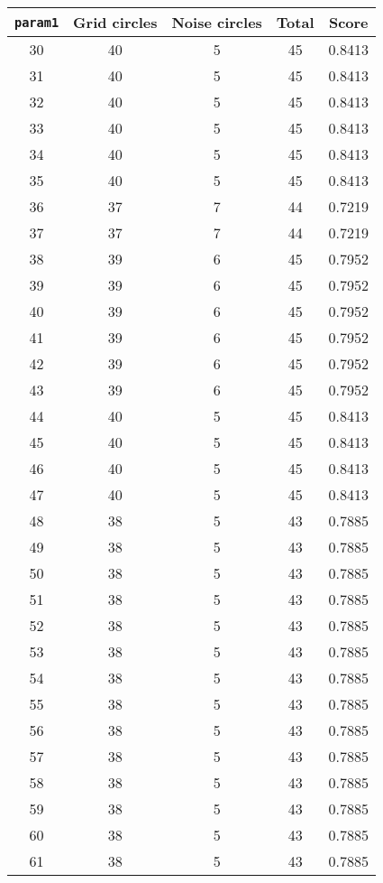 \documentclass[letterpaper, 12pt]{article}
\begin{document}
\begin{longtable}{|c|c|c|c|c|}
\hline
\textbf{\texttt{param1}} & \textbf{Grid circles} & \textbf{Noise circles} & \textbf{Total} & \textbf{Score} \\
\hline
30 & 40 & 5 & 45 & 0.8413 \\
\hline
31 & 40 & 5 & 45 & 0.8413 \\
\hline
32 & 40 & 5 & 45 & 0.8413 \\
\hline
33 & 40 & 5 & 45 & 0.8413 \\
\hline
34 & 40 & 5 & 45 & 0.8413 \\
\hline
35 & 40 & 5 & 45 & 0.8413 \\
\hline
36 & 37 & 7 & 44 & 0.7219 \\
\hline
37 & 37 & 7 & 44 & 0.7219 \\
\hline
38 & 39 & 6 & 45 & 0.7952 \\
\hline
39 & 39 & 6 & 45 & 0.7952 \\
\hline
40 & 39 & 6 & 45 & 0.7952 \\
\hline
41 & 39 & 6 & 45 & 0.7952 \\
\hline
42 & 39 & 6 & 45 & 0.7952 \\
\hline
43 & 39 & 6 & 45 & 0.7952 \\
\hline
44 & 40 & 5 & 45 & 0.8413 \\
\hline
45 & 40 & 5 & 45 & 0.8413 \\
\hline
46 & 40 & 5 & 45 & 0.8413 \\
\hline
47 & 40 & 5 & 45 & 0.8413 \\
\hline
48 & 38 & 5 & 43 & 0.7885 \\
\hline
49 & 38 & 5 & 43 & 0.7885 \\
\hline
50 & 38 & 5 & 43 & 0.7885 \\
\hline
51 & 38 & 5 & 43 & 0.7885 \\
\hline
52 & 38 & 5 & 43 & 0.7885 \\
\hline
53 & 38 & 5 & 43 & 0.7885 \\
\hline
54 & 38 & 5 & 43 & 0.7885 \\
\hline
55 & 38 & 5 & 43 & 0.7885 \\
\hline
56 & 38 & 5 & 43 & 0.7885 \\
\hline
57 & 38 & 5 & 43 & 0.7885 \\
\hline
58 & 38 & 5 & 43 & 0.7885 \\
\hline
59 & 38 & 5 & 43 & 0.7885 \\
\hline
60 & 38 & 5 & 43 & 0.7885 \\
\hline
61 & 38 & 5 & 43 & 0.7885 \\

\end{longtable}
\end{document}
